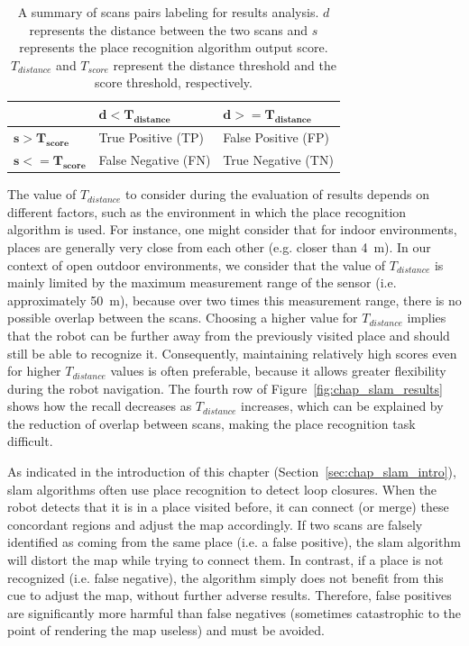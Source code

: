 \begin{table}[H]
    \centering
    \begin{tabular}{@{}l|ll@{}}
        \toprule
                                  & $\mathbf{d < T_{distance}}$ & $\mathbf{d >= T_{distance}}$ \\
        \hline
        $\mathbf{s > T_{score}}$  & True Positive (TP)          & False Positive (FP) \\
        $\mathbf{s <= T_{score}}$ & False Negative (FN)         & True Negative (TN) \\
        \bottomrule
    \end{tabular}
    \caption[Summary of scans pairs labeling for results analysis.]{A summary of scans pairs labeling for results analysis. $d$ represents the distance between the two scans and $s$ represents the place recognition algorithm output score. $T_{distance}$ and $T_{score}$ represent the distance threshold and the score threshold, respectively.}
    \label{tab:chap_slam_results_labeling}
\end{table}

The value of $T_{distance}$ to consider during the evaluation of results depends on different factors, such as the environment in which the place recognition algorithm is used. For instance, one might consider that for indoor environments, places are generally very close from each other (e.g. closer than \SI{4}{\meter}). In our context of open outdoor environments, we consider that the value of $T_{distance}$ is mainly limited by the maximum measurement range of the sensor (i.e. approximately \SI{50}{\meter}), because over two times this measurement range, there is no possible overlap between the scans. Choosing a higher value for $T_{distance}$ implies that the robot can be further away from the previously visited place and should still be able to recognize it. Consequently, maintaining relatively high scores even for higher $T_{distance}$ values is often preferable, because it allows greater flexibility during the robot navigation. The fourth row of Figure~\ref{fig:chap_slam_results} shows how the recall decreases as $T_{distance}$ increases, which can be explained by the reduction of overlap between scans, making the place recognition task difficult.

As indicated in the introduction of this chapter (Section~\ref{sec:chap_slam_intro}), \gls*{slam} algorithms often use place recognition to detect loop closures. When the robot detects that it is in a place visited before, it can connect (or merge) these concordant regions and adjust the map accordingly. If two scans are falsely identified as coming from the same place (i.e. a false positive), the \gls*{slam} algorithm will distort the map while trying to connect them. In contrast, if a place is not recognized (i.e. false negative), the algorithm simply does not benefit from this cue to adjust the map, without further adverse results. Therefore, false positives are significantly more harmful than false negatives (sometimes catastrophic to the point of rendering the map useless) and must be avoided. 

